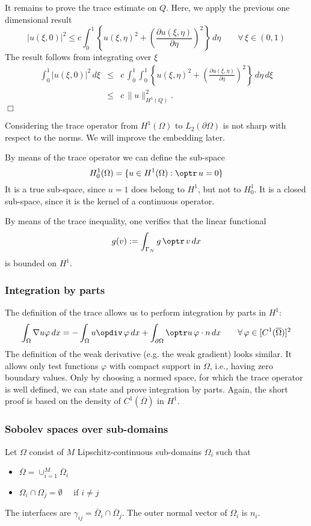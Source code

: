 It remains to prove the trace estimate on $Q$. Here, we apply the previous
one dimensional result 
$$
| u(\xi, 0)|^2 \leq c \int_0^1 \left\{ u(\xi,\eta)^2 + \left(\frac{\partial u(\xi,\eta)}{\partial \eta}\right)^2 \right\} \, d \eta
\qquad \forall \, \xi \in (0,1)
$$
The result follows from integrating over $\xi$
\begin{eqnarray*}
\int_0^1 |  u(\xi, 0)|^2 \, d\xi & \leq & 
 c \, \int_0^1  \int_0^1  \left\{ u(\xi,\eta)^2 + \left(\frac{\partial u(\xi,\eta)}{\partial \eta}\right)^2 \right\} \, d \eta \, d \xi \\
        & \leq & c \, \| u \|_{H^1(Q)}^2.
\end{eqnarray*}
\hfill $\Box$


\bigskip

Considering the trace operator from $H^1(\Omega)$ to $L_2(\partial \Omega)$ is
not sharp with respect to the norms. We will improve the embedding later.

\bigskip

By means of the trace operator we can define the sub-space
$$
H_0^1(\Omega) = \{ u \in H^1(\Omega) : \optr \, u = 0 \}
$$
It is a true sub-space, since $u = 1$ does belong to $H^1$, but not to $H_0^1$.
It is a closed sub-space, since it is the kernel of a continuous operator.


\bigskip

By means of the trace inequality, one verifies that the linear functional
$$
g(v) := \int_{\Gamma_N} g \, \optr \, v \, dx
$$
is bounded on $H^1$. 


\subsubsection{Integration by parts}
The definition of the trace allows us to perform integration by
parts in $H^1$:
$$
\int_{\Omega} \nabla u \varphi \, dx = -\int_\Omega u \opdiv \, \varphi \, dx 
        + \int_{\partial \Omega} \optr u \, \varphi \cdot n \, dx 
\qquad \forall \, \varphi \in [C^1(\overline{\Omega})]^2
$$
The definition of the weak derivative (e.g. the weak gradient) looks similar.
It allows only test functions $\varphi$ with compact support in $\Omega$, i.e.,
having zero boundary values. Only by choosing a normed space, for which the 
trace operator is well defined, we can state and prove integration by parts.
Again, the short proof is based on the density of $C^1(\overline \Omega)$ 
in $H^1$.

\subsubsection{Sobolev spaces over sub-domains}
Let $\Omega$ consist of $M$ Lipschitz-continuous sub-domains $\Omega_i$ 
such that
\begin{itemize}
\item $\overline \Omega = \cup_{i=1}^M \overline \Omega_i$
\item $\Omega_i \cap \Omega_j = \emptyset \quad \mbox{ if } i \neq j$
\end{itemize}
The interfaces are $\gamma_{ij} = \overline \Omega_i \cap \overline \Omega_j$.
The outer normal vector of $\Omega_i$ is $n_i$.

